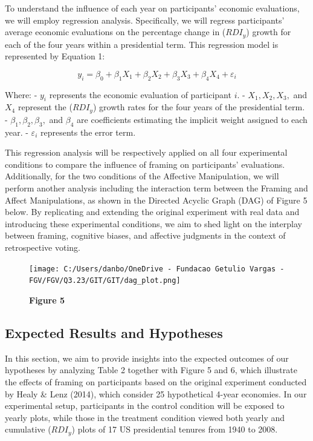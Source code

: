 \documentclass[
]{article}
\begin{document}
To understand the influence of each year on participants' economic
evaluations, we will employ regression analysis. Specifically, we will
regress participants' average economic evaluations on the percentage
change in (\(RDI_y\)) growth for each of the four years within a
presidential term. This regression model is represented by Equation 1:

\[
y_i = \beta_0 + \beta_1 X_1 + \beta_2 X_2 + \beta_3 X_3 + \beta_4 X_4 + \varepsilon_i
\]

Where: - \(y_i\) represents the economic evaluation of participant
\(i\). - \(X_1, X_2, X_3,\) and \(X_4\) represent the (\(RDI_y\)) growth
rates for the four years of the presidential term. -
\(\beta_1, \beta_2, \beta_3,\) and \(\beta_4\) are coefficients
estimating the implicit weight assigned to each year. -
\(\varepsilon_i\) represents the error term.

This regression analysis will be respectively applied on all four
experimental conditions to compare the influence of framing on
participants' evaluations. Additionally, for the two conditions of the
Affective Manipulation, we will perform another analysis including the
interaction term between the Framing and Affect Manipulations, as shown
in the Directed Acyclic Graph (DAG) of Figure 5 below. By replicating
and extending the original experiment with real data and introducing
these experimental conditions, we aim to shed light on the interplay
between framing, cognitive biases, and affective judgments in the
context of retrospective voting.

\begin{figure}
\centering
\texttt{[image: C:/Users/danbo/OneDrive - Fundacao Getulio Vargas - FGV/FGV/Q3.23/GIT/GIT/dag\_plot.png]}
\caption{\textbf{Figure 5}}
\end{figure}

\hypertarget{expected-results-and-hypotheses}{%
\subsection{Expected Results and
Hypotheses}\label{expected-results-and-hypotheses}}

In this section, we aim to provide insights into the expected outcomes
of our hypotheses by analyzing Table 2 together with Figure 5 and 6,
which illustrate the effects of framing on participants based on the
original experiment conducted by Healy \& Lenz (2014), which consider 25
hypothetical 4-year economies. In our experimental setup, participants
in the control condition will be exposed to yearly plots, while those in
the treatment condition viewed both yearly and cumulative (\(RDI_y\))
plots of 17 US presidential tenures from 1940 to 2008.
\end{document}
